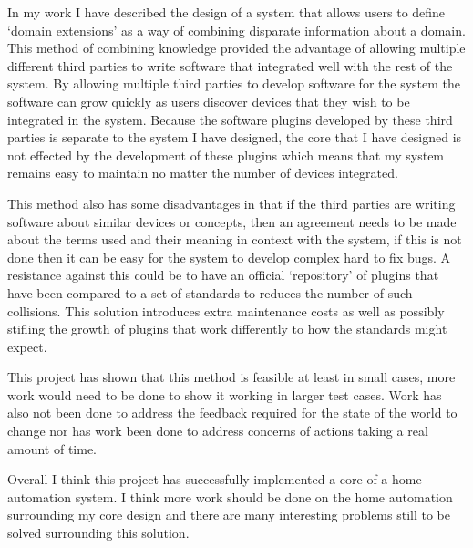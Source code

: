 In my work I have described the design of a system that allows users to define
`domain extensions' as a way of combining disparate information about a domain.
This method of combining knowledge provided the advantage of allowing multiple
different third parties to write software that integrated well with the rest of
the system. By allowing multiple third parties to develop software for the
system the software can grow quickly as users discover devices that they wish to
be integrated in the system. Because the software plugins developed by these
third parties is separate to the system I have designed, the core that I have
designed is not effected by the development of these plugins which means that my
system remains easy to maintain no matter the number of devices integrated.

This method also has some disadvantages in that if the third parties are writing
software about similar devices or concepts, then an agreement needs to be made
about the terms used and their meaning in context with the system, if this is
not done then it can be easy for the system to develop complex hard to fix bugs.
A resistance against this could be to have an official `repository' of plugins
that have been compared to a set of standards to reduces the number of such
collisions. This solution introduces extra maintenance costs as well as
possibly stifling the growth of plugins that work differently to how the
standards might expect.

This project has shown that this method is feasible at least in small cases,
more work would need to be done to show it working in larger test cases. Work
has also not been done to address the feedback required for the state of the
world to change nor has work been done to address concerns of actions taking a
real amount of time.

Overall I think this project has successfully implemented a core of a home
automation system. I think more work should be done on the home automation
surrounding my core design and there are many interesting problems still to be
solved surrounding this solution.

